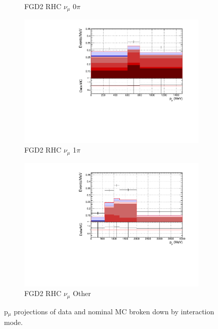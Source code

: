 \begin{figure}
\begin{subfigure}{.32\textwidth}
  \caption{FGD2 RHC $\nu_{\mu}$ 0$\pi$}
  \label{fig:pstack_FGD2_NuMuBkg_CC0pi_in_AntiNu_Mode}
\end{subfigure}
\begin{subfigure}{.32\textwidth}
  \centering
  \includegraphics[width=0.95\linewidth]{figs/FGD2_NuMuBkg_CC1pi_in_AntiNu_Mode_p}
  \caption{FGD2 RHC $\nu_{\mu}$ 1$\pi$}
  \label{fig:pstack_FGD2_NuMuBkg_CC1pi_in_AntiNu_Mode}
\end{subfigure}
\begin{subfigure}{.32\textwidth}
  \centering
  \includegraphics[width=0.95\linewidth]{figs/FGD2_NuMuBkg_CCOther_in_AntiNu_Mode_p}
  \caption{FGD2 RHC $\nu_{\mu}$ Other}
  \label{fig:pstack_FGD2_NuMuBkg_CCOther_in_AntiNu_Mode}
\end{subfigure}
\caption{p$_{\mu}$ projections of data and nominal MC broken down by interaction mode.}
\label{fig:pstack}
\end{figure}

